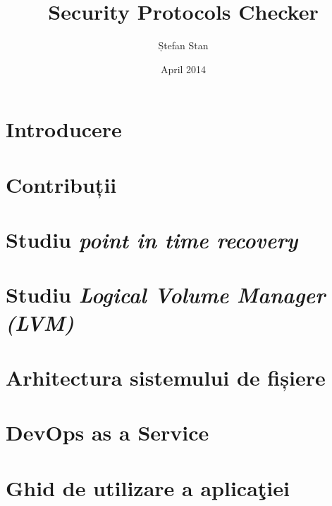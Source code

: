 \documentclass[12, twoside]{report}
\title{
	{Security Protocols Checker}
}
\author{Ștefan Stan}
\date{April 2014}
\begin{document}

\newpage

\newpage

\tableofcontents

\renewcommand{\baselinestretch}{1.5} 

\renewcommand{\bibname}{Bibliografie}

\chapter*{Introducere}


\chapter*{Contribuții}


\chapter{Studiu \textit{point in time recovery}}


\chapter{Studiu \textit{Logical Volume Manager (LVM)}}


\chapter{Arhitectura sistemului de fișiere}


\chapter{DevOps as a Service}


\chapter{Ghid de utilizare a aplicaţiei}

\end{document}
